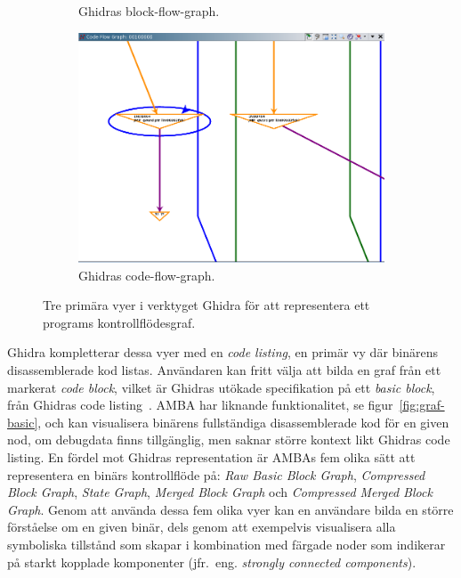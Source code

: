 \begin{figure}[H]
\begin{subfigure}{0.3\textwidth}
        \caption{Ghidras block-flow-graph.}
        \label{fig:ghidra_block_graph}
    \end{subfigure}
    \hspace*{\fill}
    \begin{subfigure}{0.3\textwidth}
        \includegraphics[width=\linewidth]{figures/ghidra_code_flow.png}
        \caption{Ghidras code-flow-graph.} \label{fig:ghidra_code_flow_graph}
    \end{subfigure}

    \caption{Tre primära vyer i verktyget Ghidra för att representera ett programs
        kontrollflödesgraf.} \label{fig:ghidra_figures}
\end{figure}

Ghidra kompletterar dessa vyer med en \textit{code listing}, en primär vy där
binärens disassemblerade kod listas. Användaren kan fritt välja att bilda en
graf från ett markerat \textit{code block}, vilket är Ghidras utökade
specifikation på ett \emph{basic block}, från Ghidras code
listing~\cite{ghidra_website}. AMBA har liknande funktionalitet, se
figur~\ref{fig:graf-basic}, och kan visualisera binärens fullständiga
disassemblerade kod för en given nod, om debugdata finns tillgänglig, men saknar
större kontext likt Ghidras code listing. En fördel mot Ghidras representation
är AMBAs fem olika sätt att representera en binärs kontrollflöde på: \textit{Raw
    Basic Block Graph}, \textit{Compressed Block Graph}, \textit{State Graph},
\textit{Merged Block Graph} och \textit{Compressed Merged Block Graph}.  Genom
att använda dessa fem olika vyer kan en användare bilda en större förståelse om
en given binär, dels genom att exempelvis visualisera alla symboliska tillstånd
som \stoe{} skapar i kombination med färgade noder som indikerar på starkt
kopplade komponenter (jfr.\ eng. \emph{strongly connected components}).

